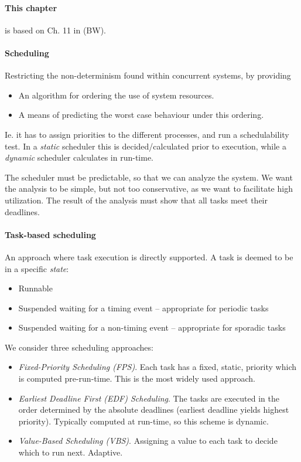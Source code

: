 
\paragraph{This chapter} is based on Ch. 11 in (BW).

\sepline

\paragraph{Scheduling} Restricting the non-determinism found within concurrent systems, by providing
\begin{itemize}[nolistsep,noitemsep]
  \item An algorithm for ordering the use of system resources.
  \item A means of predicting the worst case behaviour under this ordering.
\end{itemize}
Ie. it has to assign priorities to the different processes, and run a schedulability test. In a \textit{static} scheduler this is decided/calculated prior to execution, while a \textit{dynamic} scheduler calculates in run-time.

The scheduler must be predictable, so that we can analyze the system. We want the analysis to be simple, but not too conservative, as we want to facilitate high utilization. The result of the analysis must show that all tasks meet their deadlines.

\paragraph{Task-based scheduling} An approach where task execution is directly supported. A task is deemed to be in a specific \textit{state}:
\begin{itemize}[nolistsep,noitemsep]
  \item Runnable
  \item Suspended waiting for a timing event -- appropriate for periodic tasks
  \item Suspended waiting for a non-timing event -- appropriate for sporadic tasks
\end{itemize}
We consider three scheduling approaches:
\begin{itemize}[nolistsep,noitemsep]
  \item \textit{Fixed-Priority Scheduling (FPS)}. Each task has a fixed, static, priority which is computed pre-run-time. This is the most widely used approach.
  \item \textit{Earliest Deadline First (EDF) Scheduling}. The tasks are executed in the order determined by the absolute deadlines (earliest deadline yields highest priority). Typically computed at run-time, so this scheme is dynamic.
  \item \textit{Value-Based Scheduling (VBS)}. Assigning a value to each task to decide which to run next. Adaptive.
\end{itemize}


